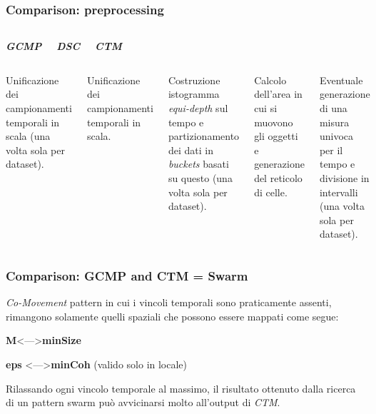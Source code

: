 \documentclass{beamer}
\begin{document}
\begin{frame}
	\frametitle{Comparison: preprocessing}
	\begin{columns}
		
		\begin{center}
			\textbf{\textit{\huge{GCMP}}}
			
		\end{center}
		
		\begin{center}
			\textbf{\textit{\huge{DSC}}}
			
		\end{center}
		
		\begin{center}
			\textbf{\textit{\huge{CTM}}}
			
		\end{center}
	\end{columns}
	\begin{columns}
		
		\column{.3\columnwidth}
		
		Unificazione dei campionamenti temporali in scala  (una volta sola per dataset).
		
		
		\column{.3\textwidth}
		
		Unificazione dei campionamenti temporali in scala.
		
		Costruzione istogramma \textit{equi-depth} sul tempo e partizionamento dei dati in \textit{buckets}
		basati su questo  (una volta sola per dataset).
		
		\column{.3\textwidth}
		
		Calcolo dell'area in cui si muovono gli oggetti e generazione del reticolo di celle.
		
		Eventuale generazione di una misura univoca per il tempo e divisione in intervalli 
		 (una volta sola per dataset).
		
	\end{columns}
\end{frame}  



\begin{frame}
	\frametitle{Comparison: GCMP and CTM = Swarm}
 \textit{Co-Movement} pattern in cui i vincoli temporali sono praticamente assenti, 
 rimangono solamente quelli spaziali che possono essere mappati come segue:
 
 \begin{center}
 	\textbf{M}\textless ---\textgreater  \textbf{minSize}
 	
 	\textbf{eps} \textless ---\textgreater  \textbf{minCoh} (valido solo in locale)
 	
 	
 \end{center}
Rilassando ogni vincolo temporale al massimo, il risultato ottenuto dalla ricerca di un pattern swarm può avvicinarsi molto all'output di \textit{CTM}.
\end{frame}
\end{document}
